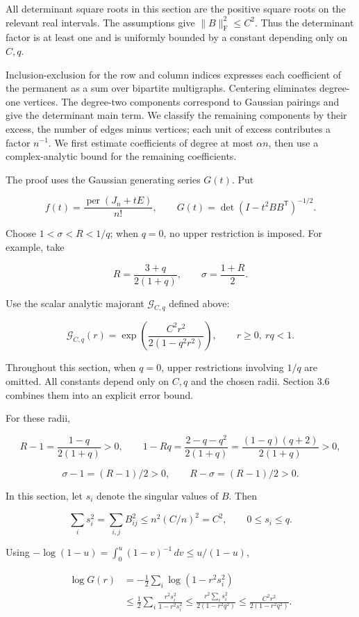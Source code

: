 \documentclass[11pt,a4paper]{article}
\begin{document}
All determinant square roots in this section are the positive square roots on the relevant real intervals. The assumptions give \(\|B\|_{\mathrm F}^2\le C^2\). Thus the determinant factor is at least one and is uniformly bounded by a constant depending only on \(C,q\).

Inclusion-exclusion for the row and column indices expresses each coefficient of the permanent as a sum over bipartite multigraphs. Centering eliminates degree-one vertices. The degree-two components correspond to Gaussian pairings and give the determinant main term. We classify the remaining components by their excess, the number of edges minus vertices; each unit of excess contributes a factor \(n^{-1}\). We first estimate coefficients of degree at most \(\alpha n\), then use a complex-analytic bound for the remaining coefficients.

The proof uses the Gaussian generating series \(G(t)\). Put

\[
f(t)=\frac{\operatorname{per}(J_n+tE)}{n!},
\qquad G(t)=\det(I-t^2BB^{\mathsf T})^{-1/2}.
\]

Choose \(1<\sigma<R<1/q\); when \(q=0\), no upper restriction is imposed. For example, take

\[
R=\frac{3+q}{2(1+q)},\qquad \sigma=\frac{1+R}{2}.
\]

Use the scalar analytic majorant \(\mathcal G_{C,q}\) defined above:

\[
\mathcal G_{C,q}(r)=\exp\left(\frac{C^2r^2}{2(1-q^2r^2)}\right),
\qquad r\ge0,\ rq<1.
\]

Throughout this section, when \(q=0\), upper restrictions involving \(1/q\) are omitted. All constants depend only on \(C,q\) and the chosen radii. Section 3.6 combines them into an explicit error bound.

For these radii,

\[
R-1=\frac{1-q}{2(1+q)}>0,\qquad
1-Rq=\frac{2-q-q^2}{2(1+q)}=\frac{(1-q)(q+2)}{2(1+q)}>0,
\]

\[
\sigma-1=(R-1)/2>0,\qquad R-\sigma=(R-1)/2>0.
\]

In this section, let \(s_i\) denote the singular values of \(B\). Then

\[
\sum_i s_i^2=\sum_{i,j}B_{ij}^2\le n^2(C/n)^2=C^2,\qquad
0\le s_i\le q.
\]

Using \(-\log(1-u)=\int_0^u(1-v)^{-1}\,dv\le u/(1-u)\),

\[
\begin{aligned}
\log G(r)&=-\frac12\sum_i\log(1-r^2s_i^2)\\
&\le\frac12\sum_i\frac{r^2s_i^2}{1-r^2s_i^2}
\le\frac{r^2\sum_i s_i^2}{2(1-r^2q^2)}
\le\frac{C^2r^2}{2(1-r^2q^2)}.
\end{aligned}
\]
\end{document}
